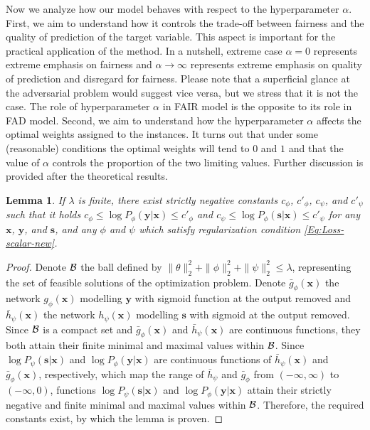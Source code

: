 \documentclass[preprint,12pt]{elsarticle}
\newtheorem{lemma}{Lemma}
\begin{document}
Now we analyze how our model behaves with respect to the hyperparameter $\alpha$. First, we aim to understand how it controls the trade-off between fairness and the quality of prediction of the target variable. This aspect is important for the practical application of the method. In a nutshell, extreme case $\alpha=0$ represents extreme emphasis on fairness and $\alpha\rightarrow\infty$ represents extreme emphasis on quality of prediction and disregard for fairness. Please note that a superficial glance at the adversarial problem would suggest vice versa, but we stress that it is not the case. The role of hyperparameter $\alpha$ in FAIR model is the opposite to its role in FAD model. Second, we aim to understand how the hyperparameter $\alpha$ affects the optimal weights assigned to the instances. It turns out that under some (reasonable) conditions the optimal weights will tend to $0$ and $1$ and that the value of $\alpha$ controls the proportion of the two limiting values. Further discussion is provided after the theoretical results.

\begin{lemma}
	If $\lambda$ is finite, there exist strictly negative constants
	$c_\phi$, $c'_\phi$, $c_\psi$, and $c'_\psi$ such that it holds
	$c_\phi\leq \log P_\phi(\mathbf{y}|\mathbf{x})\leq c'_\phi$ and
	$c_\psi\leq \log P_\phi(\mathbf{s}|\mathbf{x})\leq c'_\psi$ for
	any $\mathbf{x}$, $\mathbf{y}$, and $\mathbf{s}$, and any
	$\phi$ and $\psi$ which satisfy regularization condition \ref{Eq:Loss-scalar-new}.
	\label{pp:bounded}
\end{lemma}
\begin{proof}
	Denote ${\cal B}$ the ball defined by $\|\theta\|^2_2+\|\phi\|^2_2+\|\psi\|^2_2\leq \lambda$, representing the set of feasible solutions of the optimization problem.
	Denote $\bar{g}_\phi(\mathbf{x})$ the network $g_\phi(\mathbf{x})$ modelling $\mathbf{y}$ with sigmoid function at the output removed and $\bar{h}_\psi(\mathbf{x})$ the network $h_\psi(\mathbf{x})$ modelling $\mathbf{s}$ with sigmoid at the output removed. Since ${\cal B}$ is a compact set and $\bar{g}_\phi(\mathbf{x})$ and $\bar{h}_\psi(\mathbf{x})$ are continuous functions, they both attain their finite minimal and maximal values within ${\cal B}$. Since $\log P_\psi(\mathbf{s}|\mathbf{x})$ and $\log P_\phi(\mathbf{y}|\mathbf{x})$ are continuous functions of  $\bar{h}_\psi(\mathbf{x})$ and $\bar{g}_\phi(\mathbf{x})$, respectively, which map the range of $\bar{h}_\psi$ and $\bar{g}_\phi$ from $(-\infty,\infty)$ to $(-\infty, 0)$, functions $\log P_\psi(\mathbf{s}|\mathbf{x})$ and $\log P_\phi(\mathbf{y}|\mathbf{x})$ attain their strictly negative and finite minimal and maximal values within ${\cal B}$. Therefore, the required constants exist, by which the lemma is proven.
\end{proof}
\end{document}
